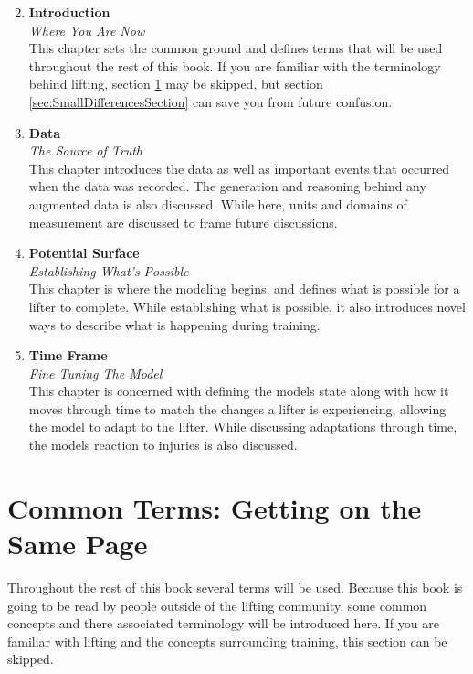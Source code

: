 \begin{enumerate}
    \setcounter{enumi}{1}
    \item \textbf{Introduction} \\ \textit{Where You Are Now} \\
    		This chapter sets the common ground and defines terms that will be used throughout the rest of this book. If you are familiar with the terminology behind lifting, section \ref{sec:CommonTermsSection} may be skipped, but section \ref{sec:SmallDifferencesSection} can save you from future confusion.
    		
    \item \textbf{Data} \\ \textit{The Source of Truth} \\
        This chapter introduces the data as well as important events that occurred when the data was recorded. The generation and reasoning behind any augmented data is also discussed. While here, units and domains of measurement are discussed to frame future discussions.
        
    \item \textbf{Potential Surface} \\ \textit{Establishing What's Possible} \\
        This chapter is where the modeling begins, and defines what is possible for a lifter to complete. While establishing what is possible, it also introduces novel ways to describe what is happening during training.
        
    \item \textbf{Time Frame} \\ \textit{Fine Tuning The Model} \\
        This chapter is concerned with defining the models state along with how it moves through time to match the changes a lifter is experiencing, allowing the model to adapt to the lifter. While discussing adaptations through time, the models reaction to injuries is also discussed.
\end{enumerate}

\section{Common Terms: Getting on the Same Page}
\label{sec:CommonTermsSection}

Throughout the rest of this book several terms will be used. Because this book is going to be read by people outside of the lifting community, some common concepts and there associated terminology will be introduced here. If you are familiar with lifting and the concepts surrounding training, this section can be skipped.

